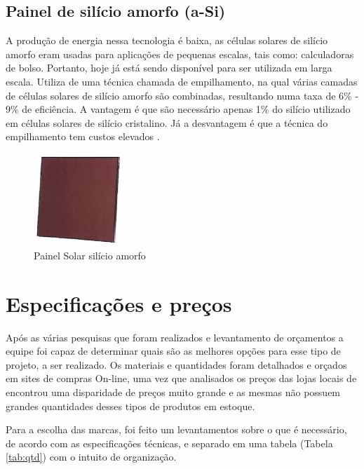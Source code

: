 \subsection{Painel de silício amorfo (a-Si)}

A produção de energia nessa tecnologia é baixa, as células solares de silício amorfo eram usadas para aplicações de pequenas escalas, tais como: calculadoras de bolso. Portanto, hoje já está sendo disponível para ser utilizada em larga escala.  Utiliza de uma técnica chamada de empilhamento, na qual várias camadas de células solares de silício amorfo são combinadas, resultando numa taxa de 6\% - 9\% de eficiência. A vantagem é que são necessário apenas 1\% do silício utilizado em células solares de silício cristalino. Já a desvantagem é que a técnica do empilhamento tem custos elevados \cite{neosolar}.

\begin{figure}[!h]
\centering
\includegraphics[width=0.3\textwidth]{figuras/marrom.png}
\caption{Painel Solar silício amorfo}
\label{fig:marrom}
\end{figure}

\section{Especificações e preços}
Após as várias pesquisas que foram realizados e levantamento de orçamentos a equipe foi capaz de determinar quais são as melhores opções para esse tipo de projeto, a ser realizado. Os materiais e quantidades foram detalhados e orçados em sites de compras On-line, uma vez que analisados os preços das lojas locais de encontrou uma disparidade de preços muito grande e as mesmas não possuem grandes quantidades desses tipos de produtos em estoque.

\par Para a escolha das marcas, foi feito um levantamentos sobre o que é necessário, de acordo com as especificações técnicas, e separado em uma tabela (Tabela \ref{tab:qtd}) com o intuito de organização.


